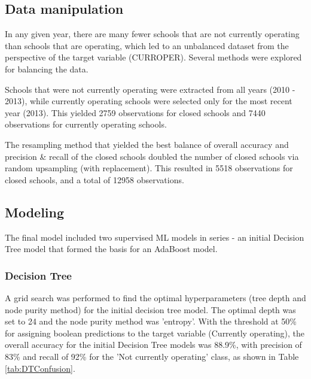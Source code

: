 \documentclass[11pt, letterpaper]{article}
\begin{document}
\subsection{Data manipulation}
In any given year, there are many fewer schools that are not currently operating than schools that are operating, which led to an unbalanced dataset from the perspective of the target variable (CURROPER). Several methods were explored for balancing the data.

Schools that were not currently operating were extracted from all years (2010 - 2013), while currently operating schools were selected only for the most recent year (2013). This yielded 2759 observations for closed schools and 7440 observations for currently operating schools.

The resampling method that yielded the best balance of overall accuracy and precision \& recall of the closed schools doubled the number of closed schools via random upsampling (with replacement). This resulted in 5518 observations for closed schools, and a total of 12958 observations.

\subsection{Modeling}
The final model included two supervised ML models in series - an initial Decision Tree model that formed the basis for an AdaBoost model. 

 \subsubsection{Decision Tree}
 A grid search was performed to find the optimal hyperparameters (tree depth and node purity method) for the initial decision tree model. The optimal depth was set to 24 and the node purity method was 'entropy'. With the  threshold at 50\% for assigning boolean predictions to the target variable (Currently operating), the overall accuracy for the initial Decision Tree models was 88.9\%, with precision of 83\% and recall of 92\% for the 'Not currently operating' class, as shown in Table \ref{tab:DTConfusion}.
   
\end{document}
